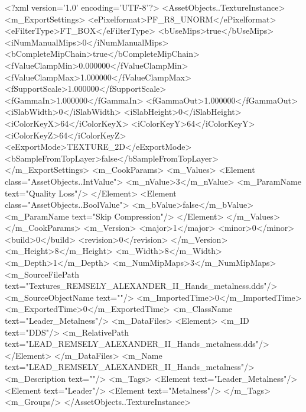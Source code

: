 <?xml version='1.0' encoding='UTF-8'?>
<AssetObjects..TextureInstance>
  <m_ExportSettings>
    <ePixelformat>PF_R8_UNORM</ePixelformat>
    <eFilterType>FT_BOX</eFilterType>
    <bUseMips>true</bUseMips>
    <iNumManualMips>0</iNumManualMips>
    <bCompleteMipChain>true</bCompleteMipChain>
    <fValueClampMin>0.000000</fValueClampMin>
    <fValueClampMax>1.000000</fValueClampMax>
    <fSupportScale>1.000000</fSupportScale>
    <fGammaIn>1.000000</fGammaIn>
    <fGammaOut>1.000000</fGammaOut>
    <iSlabWidth>0</iSlabWidth>
    <iSlabHeight>0</iSlabHeight>
    <iColorKeyX>64</iColorKeyX>
    <iColorKeyY>64</iColorKeyY>
    <iColorKeyZ>64</iColorKeyZ>
    <eExportMode>TEXTURE_2D</eExportMode>
    <bSampleFromTopLayer>false</bSampleFromTopLayer>
  </m_ExportSettings>
  <m_CookParams>
    <m_Values>
      <Element class="AssetObjects..IntValue">
        <m_nValue>3</m_nValue>
        <m_ParamName text="Quality Loss"/>
      </Element>
      <Element class="AssetObjects..BoolValue">
        <m_bValue>false</m_bValue>
        <m_ParamName text="Skip Compression"/>
      </Element>
    </m_Values>
  </m_CookParams>
  <m_Version>
    <major>1</major>
    <minor>0</minor>
    <build>0</build>
    <revision>0</revision>
  </m_Version>
  <m_Height>8</m_Height>
  <m_Width>8</m_Width>
  <m_Depth>1</m_Depth>
  <m_NumMipMaps>3</m_NumMipMaps>
  <m_SourceFilePath text="Textures\LEAD_REMSELY_ALEXANDER_II_Hands_metalness.dds"/>
  <m_SourceObjectName text=""/>
  <m_ImportedTime>0</m_ImportedTime>
  <m_ExportedTime>0</m_ExportedTime>
  <m_ClassName text="Leader_Metalness"/>
  <m_DataFiles>
    <Element>
      <m_ID text="DDS"/>
      <m_RelativePath text="LEAD_REMSELY_ALEXANDER_II_Hands_metalness.dds"/>
    </Element>
  </m_DataFiles>
  <m_Name text="LEAD_REMSELY_ALEXANDER_II_Hands_metalness"/>
  <m_Description text=""/>
  <m_Tags>
    <Element text="Leader_Metalness"/>
    <Element text="Leader"/>
    <Element text="Metalness"/>
  </m_Tags>
  <m_Groups/>
</AssetObjects..TextureInstance>
